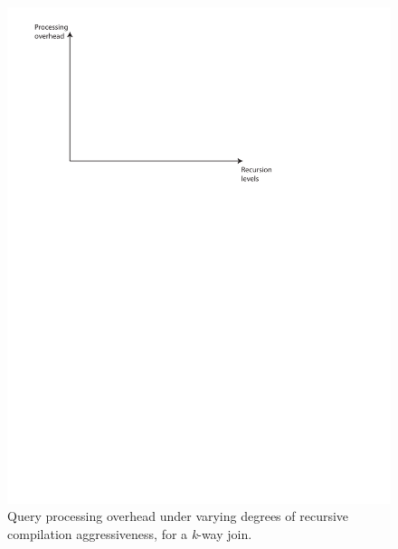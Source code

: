{\begin{figure}
\includegraphics[scale=0.6]{figures/axes-rlevels.pdf}
\caption{Query processing overhead under varying degrees of recursive
compilation aggressiveness, for a \textit{k}-way join.}
\label{fig:overhead-recursion-levels-join}
\end{figure}

}

